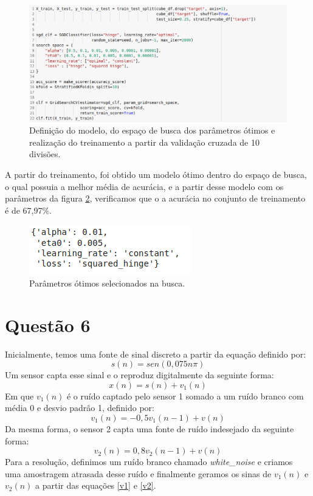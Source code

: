 \documentclass[a4paper, 12pt]{article}
\begin{document}
\begin{figure}[h]
	\centering
 	\includegraphics[width=\linewidth]{figuras/quest5_model1.png}
    \caption{Definição do modelo, do espaço de busca dos parâmetros ótimos e realização do treinamento a partir da validação cruzada de 10 divisões.}
    \label{fig:quest5_modelo}
\end{figure}
\FloatBarrier

A partir do treinamento, foi obtido um modelo ótimo dentro do espaço de busca, o qual possuia a melhor média de acurácia, e a partir desse modelo com os parâmetros da figura \ref{fig:quest5_parametros}, verificamos que o a acurácia no conjunto de treinamento é de 67,97\%.

\begin{figure}[h]
	\centering
 	\includegraphics[width=0.6\linewidth]{figuras/quest5_parametros.png}
    \caption{Parâmetros ótimos selecionados na busca.}
    \label{fig:quest5_parametros}
\end{figure}
\FloatBarrier

\section{Questão 6}

Inicialmente, temos uma fonte de sinal discreto a partir da equação definido por: \begin{equation}
s(n) = sen(0,075n\pi)
\end{equation}Um sensor capta esse sinal e o reproduz digitalmente da seguinte forma:
\begin{equation}
x(n) = s(n) + v_1(n)
\end{equation}
Em que $v_1(n)$ é o ruído captado pelo sensor 1 somado a um ruído branco com média 0 e desvio padrão 1, definido por: 
\begin{equation}\label{v1}
v_1(n) = -0,5v_1(n-1) + v(n)
\end{equation}Da mesma forma, o sensor 2 capta uma fonte de ruído indesejado da seguinte forma:
\begin{equation}\label{v2}
v_2(n) = 0,8v_2(n-1)+v(n)
\end{equation}
Para a resolução, definimos um ruído branco chamado \textit{white\_noise} e criamos uma amostragem atrasada desse ruído e finalmente geramos os sinas de $v_1(n)$ e $v_2(n)$ a partir das equações \ref{v1} e \ref{v2}.
\end{document}
